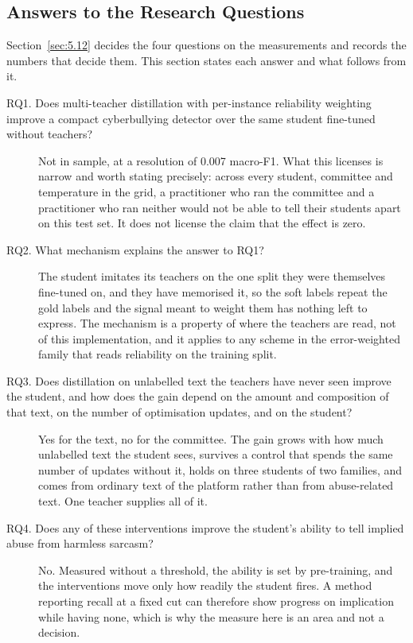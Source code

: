 \subsection{Answers to the Research Questions}
\label{sec:6.1}
Section~\ref{sec:5.12} decides the four questions on the measurements and records the numbers that
decide them. This section states each answer and what follows from it.
\begin{description}
  \item[RQ1. Does multi-teacher distillation with per-instance reliability weighting improve a compact
    cyberbullying detector over the same student fine-tuned without teachers?]
    Not in sample, at a resolution of 0.007 macro-F1. What this licenses is narrow and worth stating
    precisely: across every student, committee and temperature in the grid, a practitioner who ran the
    committee and a practitioner who ran neither would not be able to tell their students apart on this
    test set. It does not license the claim that the effect is zero.
  \item[RQ2. What mechanism explains the answer to RQ1?] The student imitates its teachers on the one
    split they were themselves fine-tuned on, and they have memorised it, so the soft labels repeat the
    gold labels and the signal meant to weight them has nothing left to express. The mechanism is a
    property of where the teachers are read, not of this implementation, and it applies to any scheme in
    the error-weighted family that reads reliability on the training split.
  \item[RQ3. Does distillation on unlabelled text the teachers have never seen improve the student, and
    how does the gain depend on the amount and composition of that text, on the number of optimisation
    updates, and on the student?] Yes for the text, no for the committee. The gain grows with how much
    unlabelled text the student sees, survives a control that spends the same number of updates without
    it, holds on three students of two families, and comes from ordinary text of the platform rather
    than from abuse-related text. One teacher supplies all of it.
  \item[RQ4. Does any of these interventions improve the student's ability to tell implied abuse from
    harmless sarcasm?] No. Measured without a threshold, the ability is set by pre-training, and the
    interventions move only how readily the student fires. A method reporting recall at a fixed cut can
    therefore show progress on implication while having none, which is why the measure here is an area
    and not a decision.
\end{description}

